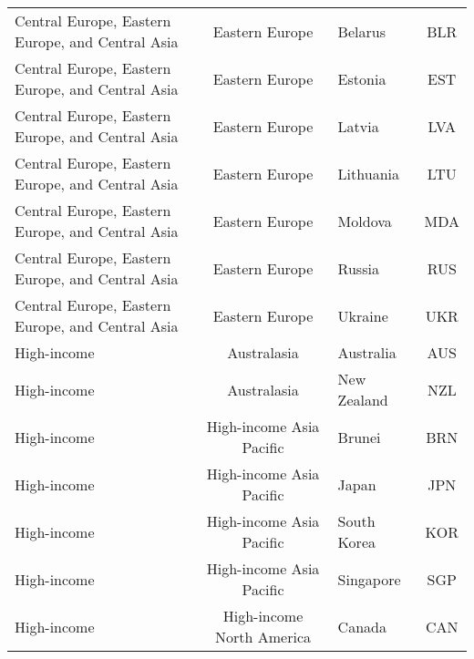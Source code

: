 \begin{landscape}
\begin{longtable}{|p{6cm}|c|p{5cm}|c|}
\raggedright Central Europe, Eastern Europe, and Central Asia &               Eastern Europe &                                           Belarus &  BLR \\
\raggedright Central Europe, Eastern Europe, and Central Asia &               Eastern Europe &                                           Estonia &  EST \\
\raggedright Central Europe, Eastern Europe, and Central Asia &               Eastern Europe &                                            Latvia &  LVA \\
\raggedright Central Europe, Eastern Europe, and Central Asia &               Eastern Europe &                                         Lithuania &  LTU \\
\raggedright Central Europe, Eastern Europe, and Central Asia &               Eastern Europe &                                           Moldova &  MDA \\
\raggedright Central Europe, Eastern Europe, and Central Asia &               Eastern Europe &                                            Russia &  RUS \\
\raggedright Central Europe, Eastern Europe, and Central Asia &               Eastern Europe &                                           Ukraine &  UKR \\
                                      High-income &                  Australasia &                                         Australia &  AUS \\
                                      High-income &                  Australasia &                                       New Zealand &  NZL \\
                                      High-income &     High-income Asia Pacific &                                            Brunei &  BRN \\
                                      High-income &     High-income Asia Pacific &                                             Japan &  JPN \\
                                      High-income &     High-income Asia Pacific &                                       South Korea &  KOR \\
                                      High-income &     High-income Asia Pacific &                                         Singapore &  SGP \\
                                      High-income &    High-income North America &                                            Canada &  CAN \\

\end{longtable}
\end{landscape}

